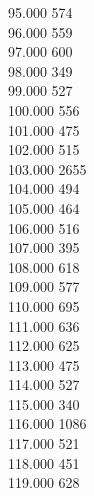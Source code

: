 { 95.000	574 \\
 96.000	559 \\
 97.000	600 \\
 98.000	349 \\
 99.000	527 \\
 100.000	556 \\
 101.000	475 \\
 102.000	515 \\
 103.000	2655 \\
 104.000	494 \\
 105.000	464 \\
 106.000	516 \\
 107.000	395 \\
 108.000	618 \\
 109.000	577 \\
 110.000	695 \\
 111.000	636 \\
 112.000	625 \\
 113.000	475 \\
 114.000	527 \\
 115.000	340 \\
 116.000	1086 \\
 117.000	521 \\
 118.000	451 \\
 119.000	628 \\
}
